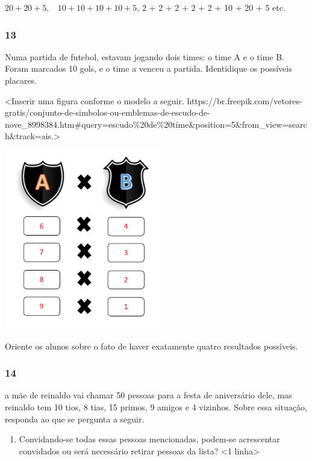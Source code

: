 \(20 + 20 + 5,\ \ \ \ 10 + 10 + 10 + 10 + 5\), 2 + 2 + 2 + 2 + 2 + 10 + 20 + 5 etc.

\subsubsection{13}\label{section-20}

Numa partida de futebol, estavam jogando dois times: o time A e o time B. Foram marcados 10 gols, e o time a venceu a partida. Identidique os possíveis placares.

\textless{}Inserir uma figura conforme o modelo a seguir.
https://br.freepik.com/vetores-gratis/conjunto-de-simbolos-ou-emblemas-de-escudo-de-nove\_8998384.htm\#query=escudo\%20de\%20time\&position=5\&from\_view=search\&track=ais.\textgreater{}

\includegraphics[width=2.78474in,height=3.08282in]{media/image19.png}

Oriente os alunos sobre o fato de haver exatamente quatro
resultados possíveis.

\subsubsection{14}\label{section-21}

a mãe de reinaldo vai chamar 50 pessoas para a festa de aniversário dele,
mas reinaldo tem 10 tios, 8 tias, 15 primos, 9 amigos e 4 vizinhos. Sobre essa situação, responda ao que se pergunta a seguir.

\begin{enumerate}
\def\labelenumi{\Alph{enumi})}
\item
  Convidando-se todas essas pessoas mencionadas, podem-se acrescentar convidados ou será necessário retirar pessoas da lista? \textless{}1 linha\textgreater{}
\end{enumerate}

